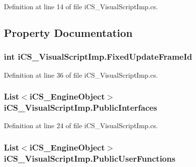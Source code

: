 Definition at line 14 of file i\+C\+S\+\_\+\+Visual\+Script\+Imp.\+cs.



\subsection{Property Documentation}
\hypertarget{classi_c_s___visual_script_imp_a763258147d8fe054e5e09777448cfb48}{
\subsubsection[{Fixed\+Update\+Frame\+Id}]{\setlength{\rightskip}{0pt plus 5cm}int i\+C\+S\+\_\+\+Visual\+Script\+Imp.\+Fixed\+Update\+Frame\+Id\hspace{0.3cm}{\ttfamily [get]}}}\label{classi_c_s___visual_script_imp_a763258147d8fe054e5e09777448cfb48}


Definition at line 36 of file i\+C\+S\+\_\+\+Visual\+Script\+Imp.\+cs.

\hypertarget{classi_c_s___visual_script_imp_a2d3c97fc922c812d129df69996106521}{
\subsubsection[{Public\+Interfaces}]{\setlength{\rightskip}{0pt plus 5cm}List$<${\bf i\+C\+S\+\_\+\+Engine\+Object}$>$ i\+C\+S\+\_\+\+Visual\+Script\+Imp.\+Public\+Interfaces\hspace{0.3cm}{\ttfamily [get]}}}\label{classi_c_s___visual_script_imp_a2d3c97fc922c812d129df69996106521}


Definition at line 24 of file i\+C\+S\+\_\+\+Visual\+Script\+Imp.\+cs.

\hypertarget{classi_c_s___visual_script_imp_ac269568fa4792d3b9a6d09d5f36cf3c5}{
\subsubsection[{Public\+User\+Functions}]{\setlength{\rightskip}{0pt plus 5cm}List$<${\bf i\+C\+S\+\_\+\+Engine\+Object}$>$ i\+C\+S\+\_\+\+Visual\+Script\+Imp.\+Public\+User\+Functions\hspace{0.3cm}{\ttfamily [get]}}}\label{classi_c_s___visual_script_imp_ac269568fa4792d3b9a6d09d5f36cf3c5}



